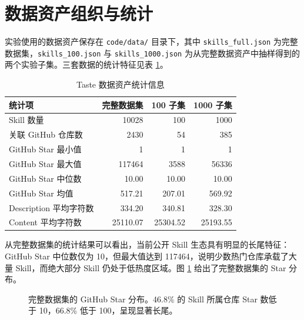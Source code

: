 \section{数据资产组织与统计}
\label{sec:data_impl}

实验使用的数据资产保存在 \texttt{code/data/} 目录下，其中 \texttt{skills\_full.json} 为完整数据集，\texttt{skills\_100.json} 与 \texttt{skills\_1000.json} 为从完整数据资产中抽样得到的两个实验子集。三套数据的统计特征见表 \ref{tab:dataset_stats_impl}。

\begin{table}[htbp]
\centering
\caption{Taste 数据资产统计信息}
\label{tab:dataset_stats_impl}
\begin{tabular}{lrrr}
\toprule
统计项 & 完整数据集 & 100 子集 & 1000 子集 \\
\midrule
Skill 数量 & 10028 & 100 & 1000 \\
关联 GitHub 仓库数 & 2430 & 54 & 385 \\
GitHub Star 最小值 & 1 & 1 & 1 \\
GitHub Star 最大值 & 117464 & 3588 & 56336 \\
GitHub Star 中位数 & 10.00 & 10.00 & 10.00 \\
GitHub Star 均值 & 517.21 & 207.01 & 569.92 \\
Description 平均字符数 & 334.20 & 340.81 & 328.30 \\
Content 平均字符数 & 25110.07 & 25304.52 & 25193.55 \\
\bottomrule
\end{tabular}
\end{table}

从完整数据集的统计结果可以看出，当前公开 Skill 生态具有明显的长尾特征：GitHub Star 中位数仅为 10，但最大值达到 117464，说明少数热门仓库承载了大量 Skill，而绝大部分 Skill 仍处于低热度区域。图 \ref{fig:star_dist_impl} 给出了完整数据集的 Star 分布。

\begin{figure}[htbp]
\centering
{}
\caption{完整数据集的 GitHub Star 分布。46.8\% 的 Skill 所属仓库 Star 数低于 10，66.8\% 低于 100，呈现显著长尾。}
\label{fig:star_dist_impl}
\end{figure}

